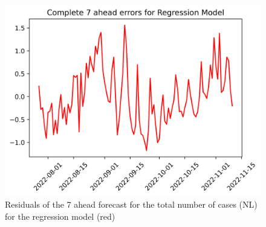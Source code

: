 \begin{figure}
\begin{minipage}{.32\textwidth}
  \label{fig:tot_cases_error_7_LLM_DE}
\end{minipage}
\begin{minipage}{.32\textwidth}
  \centering
  \includegraphics[width=\linewidth]{pics/7_ah/7_ahead_errors_Regression Model.png}
  \caption{Residuals of the 7 ahead forecast for the total number of cases (NL) for the regression model (red)}
  \label{fig:tot_cases_error_7_RM}
\end{minipage}

\end{figure}
